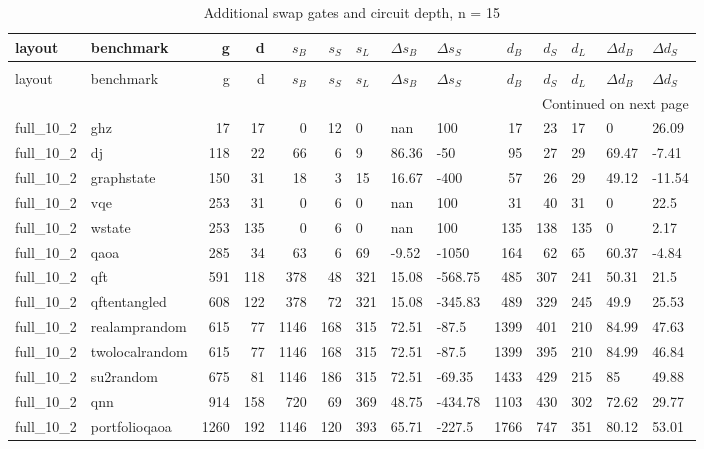 \begin{longtable}{llrrrrlllrrlll}
\caption{Additional swap gates and circuit depth, n = 15} \label{benchmark-table-15} \\
\toprule
layout & benchmark & g & d & $s_B$ & $s_S$ & $s_L$ & $\Delta s_B$ & $\Delta s_S$ & $d_B$ & $d_S$ & $d_L$ & $\Delta d_B$ & $\Delta d_S$ \\
\midrule
\endfirsthead
\caption[]{Additional swap gates and circuit depth, n = 15} \\
\toprule
layout & benchmark & g & d & $s_B$ & $s_S$ & $s_L$ & $\Delta s_B$ & $\Delta s_S$ & $d_B$ & $d_S$ & $d_L$ & $\Delta d_B$ & $\Delta d_S$ \\
\midrule
\endhead
\midrule
\multicolumn{14}{r}{Continued on next page} \\
\midrule
\endfoot
\bottomrule
\endlastfoot
full\_10\_2 & ghz & 17 & 17 & 0 & 12 & 0 & nan & 100 & 17 & 23 & 17 & 0 & 26.09 \\
full\_10\_2 & dj & 118 & 22 & 66 & 6 & 9 & 86.36 & -50 & 95 & 27 & 29 & 69.47 & -7.41 \\
full\_10\_2 & graphstate & 150 & 31 & 18 & 3 & 15 & 16.67 & -400 & 57 & 26 & 29 & 49.12 & -11.54 \\
full\_10\_2 & vqe & 253 & 31 & 0 & 6 & 0 & nan & 100 & 31 & 40 & 31 & 0 & 22.5 \\
full\_10\_2 & wstate & 253 & 135 & 0 & 6 & 0 & nan & 100 & 135 & 138 & 135 & 0 & 2.17 \\
full\_10\_2 & qaoa & 285 & 34 & 63 & 6 & 69 & -9.52 & -1050 & 164 & 62 & 65 & 60.37 & -4.84 \\
full\_10\_2 & qft & 591 & 118 & 378 & 48 & 321 & 15.08 & -568.75 & 485 & 307 & 241 & 50.31 & 21.5 \\
full\_10\_2 & qftentangled & 608 & 122 & 378 & 72 & 321 & 15.08 & -345.83 & 489 & 329 & 245 & 49.9 & 25.53 \\
full\_10\_2 & realamprandom & 615 & 77 & 1146 & 168 & 315 & 72.51 & -87.5 & 1399 & 401 & 210 & 84.99 & 47.63 \\
full\_10\_2 & twolocalrandom & 615 & 77 & 1146 & 168 & 315 & 72.51 & -87.5 & 1399 & 395 & 210 & 84.99 & 46.84 \\
full\_10\_2 & su2random & 675 & 81 & 1146 & 186 & 315 & 72.51 & -69.35 & 1433 & 429 & 215 & 85 & 49.88 \\
full\_10\_2 & qnn & 914 & 158 & 720 & 69 & 369 & 48.75 & -434.78 & 1103 & 430 & 302 & 72.62 & 29.77 \\
full\_10\_2 & portfolioqaoa & 1260 & 192 & 1146 & 120 & 393 & 65.71 & -227.5 & 1766 & 747 & 351 & 80.12 & 53.01 \\

\end{longtable}
